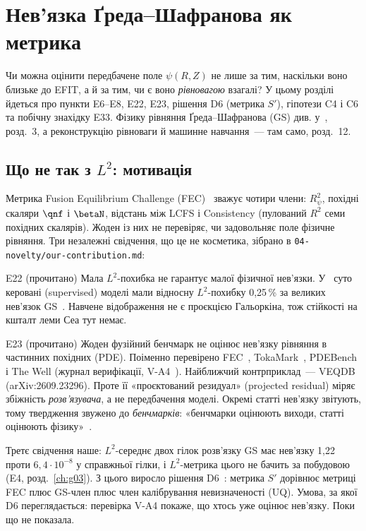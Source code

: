 \chapter{Нев'язка Ґреда--Шафранова як метрика}\label{ch:g04}

Чи можна оцінити передбачене поле $\psi(R,Z)$ не лише за тим, наскільки воно близьке до EFIT, а й за тим, чи є воно \emph{рівновагою} взагалі? У цьому розділі йдеться про пункти E6--E8, E22, E23, рішення D6 (метрика $S'$), гіпотези C4 і C6 та побічну знахідку E33. Фізику рівняння Ґреда--Шафранова (GS) див. у~\cite{Manual}, розд.~3, а реконструкцію рівноваги й машинне навчання~--- там само, розд.~12.

\section{Що не так з \texorpdfstring{$L^2$}{L2}: мотивація}\label{sec:g04-motivation}

Метрика Fusion Equilibrium Challenge (FEC)~\cite{FEC} зважує чотири члени: $R^2_\psi$, похідні скаляри $\qnf$ і $\betaN$, відстань між LCFS і Consistency (пулований $R^2$ семи похідних скалярів). Жоден із них не перевіряє, чи задовольняє поле фізичне рівняння. Три незалежні свідчення, що це не косметика, зібрано в \texttt{04-novelty/our-contribution.md}:

\begin{established}{E22 (прочитано)}
Мала $L^2$-похибка не гарантує малої фізичної нев'язки. У~\cite{Ding2025} суто керовані (supervised) моделі мали відносну $L^2$-похибку 0,25\,\% за великих нев'язок GS~\cite{RegEst}. Навчене відображення не є проєкцією Гальоркіна, тож стійкості на кшталт леми Сеа тут немає.
\end{established}

\begin{established}{E23 (прочитано)}
Жоден фузійний бенчмарк не оцінює нев'язку рівняння в частинних похідних (PDE). Поіменно перевірено FEC~\cite{FEC}, TokaMark~\cite{TokaMark2026}, PDEBench і The Well (журнал верифікації, V-A4~\cite{RegVerif}). Найближчий контрприклад~--- VEQDB (arXiv:2609.23296). Проте її «проєктований резидуал» (projected residual) міряє збіжність \emph{розв'язувача}, а не передбачення моделі. Окремі статті нев'язку звітують, тому твердження звужено до \emph{бенчмарків}: «бенчмарки оцінюють виходи, статті оцінюють фізику»~\cite{RegVerif}.
\end{established}

Третє свідчення наше: $L^2$-середнє двох гілок розв'язку GS має нев'язку 1,22 проти $6{,}4\cdot10^{-8}$ у справжньої гілки, і $L^2$-метрика цього не бачить за побудовою (E4, розд.~\ref{ch:g03}). З цього виросло рішення D6~\cite{RegDec}: метрика $S'$ дорівнює метриці FEC плюс GS-член плюс член калібрування невизначеності (UQ). Умова, за якої D6 переглядається: перевірка V-A4 покаже, що хтось уже оцінює нев'язку. Поки що не показала.

